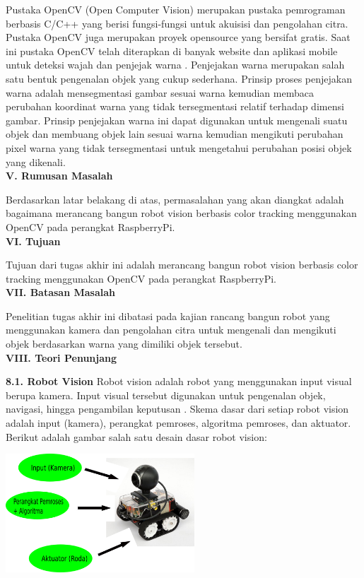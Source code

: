 \documentclass[a4paper,12pt]{article}
\begin{document}
Pustaka OpenCV (Open Computer Vision) merupakan pustaka pemrograman berbasis C/C++ yang berisi fungsi-fungsi untuk akuisisi dan pengolahan citra.
Pustaka OpenCV juga merupakan proyek opensource yang bersifat gratis.
Saat ini pustaka OpenCV telah diterapkan di banyak website dan aplikasi mobile untuk deteksi wajah dan penjejak warna \cite{opencv_intro}.
Penjejakan warna merupakan salah satu bentuk pengenalan objek yang cukup sederhana. 
Prinsip proses penjejakan warna adalah mensegmentasi gambar sesuai warna kemudian membaca perubahan koordinat warna yang tidak tersegmentasi relatif terhadap dimensi gambar.
Prinsip penjejakan warna ini dapat digunakan untuk mengenali suatu objek dan membuang objek lain sesuai warna kemudian mengikuti perubahan pixel warna yang tidak tersegmentasi untuk mengetahui perubahan posisi objek yang dikenali.
\\[10pt]
\noindent \textbf{V. \hspace{10pt} Rumusan Masalah}

Berdasarkan latar belakang di atas, permasalahan yang akan diangkat adalah bagaimana merancang bangun robot vision berbasis color tracking menggunakan OpenCV pada perangkat RaspberryPi.
\\[10pt]
\noindent \textbf{VI. \hspace{9pt} Tujuan}

Tujuan dari tugas akhir ini adalah merancang bangun robot vision berbasis color tracking menggunakan OpenCV pada perangkat RaspberryPi.
\\[10pt]
\noindent \textbf{VII. \hspace{8pt} Batasan Masalah}

Penelitian tugas akhir ini dibatasi pada kajian rancang bangun robot yang menggunakan kamera dan pengolahan citra untuk mengenali dan mengikuti objek berdasarkan warna yang dimiliki objek tersebut.
\\[10pt]
\noindent \textbf{VIII. \hspace{7pt} Teori Penunjang}

\indent \textbf{8.1. \hspace{8pt} Robot Vision}
Robot vision adalah robot yang menggunakan input visual berupa kamera.
Input visual tersebut digunakan untuk pengenalan objek, navigasi, hingga pengambilan keputusan \cite{robot_vision}.
Skema dasar dari setiap robot vision adalah input (kamera), perangkat pemroses, algoritma pemroses, dan aktuator.
Berikut adalah gambar salah satu desain dasar robot vision:
\begin{center}
 \includegraphics[width=200pt]{konsep}
\end{center}
\end{document}
